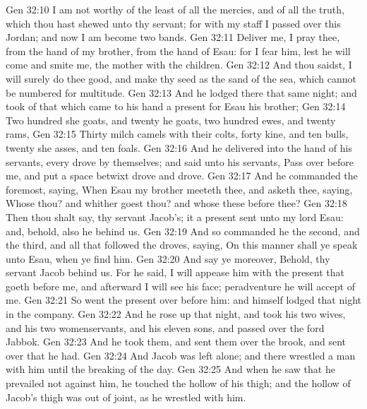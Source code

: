 \vs Gen 32:10 I am not worthy of the least of all the mercies, and of all the truth, which thou hast shewed unto thy servant; for with my staff I passed over this Jordan; and now I am become two bands.
\vs Gen 32:11 Deliver me, I pray thee, from the hand of my brother, from the hand of Esau: for I fear him, lest he will come and smite me,  the mother with the children.
\vs Gen 32:12 And thou saidst, I will surely do thee good, and make thy seed as the sand of the sea, which cannot be numbered for multitude.
\vs Gen 32:13 And he lodged there that same night; and took of that which came to his hand a present for Esau his brother;
\vs Gen 32:14 Two hundred she goats, and twenty he goats, two hundred ewes, and twenty rams,
\vs Gen 32:15 Thirty milch camels with their colts, forty kine, and ten bulls, twenty she asses, and ten foals.
\vs Gen 32:16 And he delivered  into the hand of his servants, every drove by themselves; and said unto his servants, Pass over before me, and put a space betwixt drove and drove.
\vs Gen 32:17 And he commanded the foremost, saying, When Esau my brother meeteth thee, and asketh thee, saying, Whose  thou? and whither goest thou? and whose  these before thee?
\vs Gen 32:18 Then thou shalt say,  thy servant Jacob's; it  a present sent unto my lord Esau: and, behold, also he  behind us.
\vs Gen 32:19 And so commanded he the second, and the third, and all that followed the droves, saying, On this manner shall ye speak unto Esau, when ye find him.
\vs Gen 32:20 And say ye moreover, Behold, thy servant Jacob  behind us. For he said, I will appease him with the present that goeth before me, and afterward I will see his face; peradventure he will accept of me.
\vs Gen 32:21 So went the present over before him: and himself lodged that night in the company.
\vs Gen 32:22 And he rose up that night, and took his two wives, and his two womenservants, and his eleven sons, and passed over the ford Jabbok.
\vs Gen 32:23 And he took them, and sent them over the brook, and sent over that he had.
\vs Gen 32:24 And Jacob was left alone; and there wrestled a man with him until the breaking of the day.
\vs Gen 32:25 And when he saw that he prevailed not against him, he touched the hollow of his thigh; and the hollow of Jacob's thigh was out of joint, as he wrestled with him.
